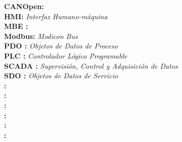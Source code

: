 \noindent
\textbf{CANOpen:} \textit{}\\
\textbf{HMI:} \textit{Interfaz Humano-máquina}\\
\textbf{MBE :} \textit{}\\
\textbf{Modbus:} \textit{Modicon Bus}\\
\textbf{PDO :} \textit{Objetos de Datos de Proceso}\\
\textbf{PLC :} \textit{Controlador Lógico Programable}\\
\textbf{SCADA :} \textit{Supervisión, Control y Adquisición de Datos}\\ %
\textbf{SDO :} \textit{Objetos de Datos de Servicio}\\
\textbf{ :} \textit{}\\
\textbf{ :} \textit{}\\
\textbf{ :} \textit{}\\
\textbf{ :} \textit{}\\
\textbf{ :} \textit{}\\
\textbf{ :} \textit{}\\

\newpage